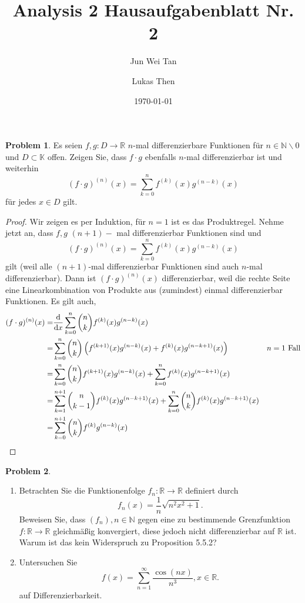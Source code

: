\documentclass[prb,12pt]{revtex4-2}
\theoremstyle{definition}
\newtheorem{Problem}{Problem}
\theoremstyle{definition}
\newcommand{\N}{\mathbb{N}}
\newcommand{\R}{\mathbb{R}}
\begin{document}
	\title{Analysis 2 Hausaufgabenblatt Nr. 2}
	\author{Jun Wei Tan}
	\author{Lukas Then}
	\date{\today}
	\maketitle
\begin{Problem}
	Es seien $f, g : D \to \R$  $n$-mal differenzierbare Funktionen für $n \in \N\backslash 0$ und $D \subset  \mathbb{K}$ offen. Zeigen Sie, dass $f \cdot g$ ebenfalls $n$-mal differenzierbar ist und weiterhin
	\[
		(f\cdot g)^{(n)}(x)=\sum_{k=0}^{n} f^{(k)}(x)g^{(n-k)}(x)\] 
		für jedes $x\in D$ gilt.
\end{Problem}
\begin{proof}
	Wir zeigen es per Induktion, für $n=1$ ist es das Produktregel. Nehme jetzt an, dass $f,g$ $(n+1)-$ mal differenzierbar Funktionen sind und 
	\[
		(f\cdot g)^{(n)}(x)=\sum_{k=0}^{n} f^{(k)}(x)g^{(n-k)}(x)\]
		gilt (weil alle $(n+1)$-mal differenzierbar Funktionen sind auch $n$-mal differenzierbar). Dann ist $(f\cdot g)^{(n)}(x)$ differenzierbar, weil die rechte Seite eine Linearkombination von Produkte aus (zumindest) einmal differenzierbar Funktionen. Es gilt auch,
		\begin{align*}
			(f\cdot g)^{(n)}(x)=&\dv{x}\sum_{k=0}^{n}\binom{n}{k} f^{(k)}(x)g^{(n-k)}(x)\\
			=& \sum_{k=0}^{n} \binom{n}{k}\left( f^{(k+1)}(x)g^{(n-k)}(x)+f^{(k)}(x)g^{(n-k+1)}(x) \right) & n=1\text{ Fall} \\
			=& \sum_{k=0}^{n} \binom{n}{k}f^{(k+1)}(x)g^{(n-k)}(x)+\sum_{k=0}^{n} f^{(k)}(x)g^{(n-k+1)}(x)\\
			=&\sum_{k=1}^{n+1} \binom{n}{k-1}f^{(k)}(x)g^{(n-k+1)}(x)+\sum_{k=0}^{n}\binom{n}{k} f^{(k)}(x)g^{(n-k+1)}(x)\\
			=&\sum_{k=0}^{n+1} \binom{n}{k}f^{(k)}g^{(n-k)}(x)
		\end{align*}
\end{proof}
\begin{Problem}
	\begin{enumerate}[label=\roman*)]
		\item Betrachten Sie die Funktionenfolge $f_n:\R \to \R$ definiert durch
\[
f_n(x)=\frac{1}{n}\sqrt{n^2x^2+1} 
.\] 
Beweisen Sie, dass $(f_n),n\in \N$ gegen eine zu bestimmende Grenzfunktion $f : \R \to \R$  gleichmäßig konvergiert, diese jedoch nicht differenzierbar auf $\R$  ist. Warum ist das kein Widerspruch zu Proposition 5.5.2?  
\item Untersuchen Sie
	\[
	f(x)=\sum_{n=1}^{\infty} \frac{\cos(nx)}{n^3}, x\in \R
	.\] 
	auf Differenzierbarkeit.
	\end{enumerate}
\end{Problem}
\end{document}
